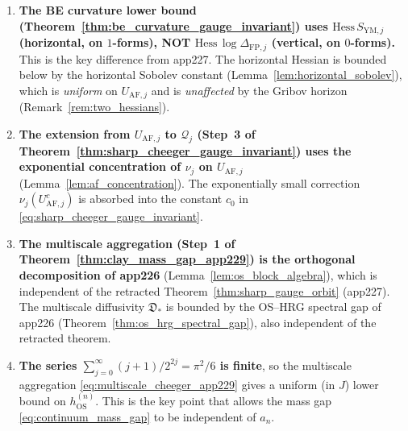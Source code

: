 \begin{remark}
\begin{enumerate}
\item \textbf{The BE curvature lower bound
(Theorem~\ref{thm:be_curvature_gauge_invariant}) uses
$\mathrm{Hess}\,S_{\mathrm{YM},j}$ (horizontal, on $1$-forms),
NOT $\mathrm{Hess}\,\log\Delta_{\mathrm{FP},j}$ (vertical, on
$0$-forms).} This is the key difference from app227. The
horizontal Hessian is bounded below by the horizontal Sobolev
constant (Lemma~\ref{lem:horizontal_sobolev}), which is
\emph{uniform} on $U_{\mathrm{AF},j}$ and is \emph{unaffected}
by the Gribov horizon (Remark~\ref{rem:two_hessians}).

\item \textbf{The extension from $U_{\mathrm{AF},j}$ to
$\mathcal{Q}_{j}$ (Step~3 of
Theorem~\ref{thm:sharp_cheeger_gauge_invariant}) uses the
exponential concentration of $\nu_{j}$ on $U_{\mathrm{AF},j}$}
(Lemma~\ref{lem:af_concentration}). The exponentially small
correction $\nu_{j}(U_{\mathrm{AF},j}^{c})$ is absorbed into
the constant $c_{0}$ in
\eqref{eq:sharp_cheeger_gauge_invariant}.

\item \textbf{The multiscale aggregation (Step~1 of
Theorem~\ref{thm:clay_mass_gap_app229}) is the orthogonal
decomposition of app226} (Lemma~\ref{lem:os_block_algebra}),
which is independent of the retracted
Theorem~\ref{thm:sharp_gauge_orbit} (app227). The
multiscale diffusivity $\mathfrak{D}_{*}$ is bounded by the
OS--HRG spectral gap of app226 (Theorem~\ref{thm:os_hrg_spectral_gap}),
also independent of the retracted theorem.

\item \textbf{The series
$\sum_{j=0}^{\infty}(j+1)/2^{2j}=\pi^{2}/6$ is finite}, so the
multiscale aggregation \eqref{eq:multiscale_cheeger_app229}
gives a uniform (in $J$) lower bound on
$h_{\mathrm{OS}}^{(n)}$. This is the key point that allows the
mass gap \eqref{eq:continuum_mass_gap} to be independent of
$a_{n}$.
\end{enumerate}


\end{remark}
